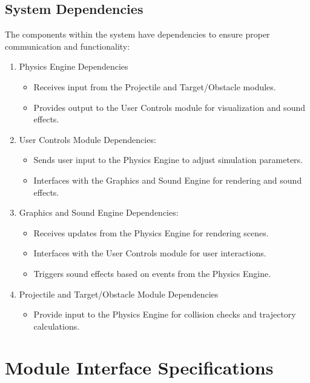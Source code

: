 \documentclass[12pt, titlepage]{article}
\begin{document}
\subsection{System Dependencies}
The components within the system have dependencies to ensure proper communication and functionality:
\begin{enumerate}
    \item Physics Engine Dependencies
\begin{itemize}
  \item Receives input from the Projectile and Target/Obstacle modules.
  \item Provides output to the User Controls module for visualization and sound effects.
\end{itemize}

\item User Controls Module Dependencies:

\begin{itemize}
  \item Sends user input to the Physics Engine to adjust simulation parameters.
  \item Interfaces with the Graphics and Sound Engine for rendering and sound effects.
\end{itemize}

  \item Graphics and Sound Engine Dependencies:


\begin{itemize}
  \item Receives updates from the Physics Engine for rendering scenes.
  \item Interfaces with the User Controls module for user interactions.
  \item Triggers sound effects based on events from the Physics Engine.
\end{itemize}

\item Projectile and Target/Obstacle Module Dependencies
\begin{itemize}
  \item Provide input to the Physics Engine for collision checks and trajectory calculations.
\end{itemize}
\end{enumerate}


\section{Module Interface Specifications}
\end{document}

